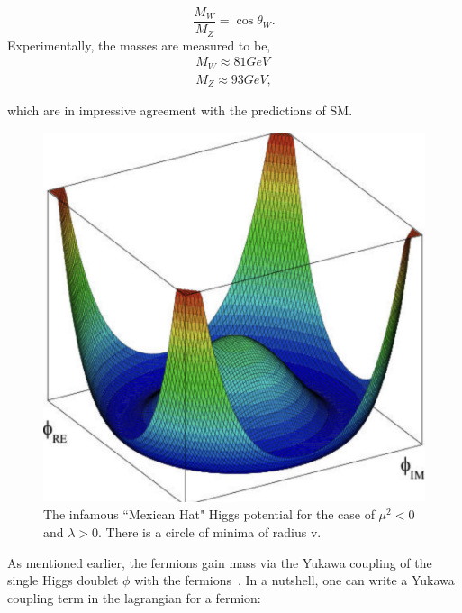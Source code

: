 \begin{equation}
    \frac{M_{W}}{M_{Z}} = \cos\theta_{W}.    
\end{equation}
Experimentally, the masses are measured to be,
\begin{equation}
\begin{align}
    M_W \approx 81 GeV \\
    M_Z \approx 93 GeV,
\end{align}
\end{equation}

which are in impressive agreement with the predictions of SM.


\begin{figure}[!htbp]
	\centering
    \includegraphics[scale=0.5]{fig/MexicanHat.png}
	\caption{The infamous ``Mexican Hat" Higgs potential for the case of $\mu^2 <0$ and $\lambda >0$. There is a circle of minima of radius v.}
	\label{fig:MexicanHat}
\end{figure}

As mentioned earlier, the fermions gain mass via the Yukawa coupling of the single Higgs doublet $\phi$ with the fermions~\cite{Nguyen:HiggsMechanism}. In a nutshell, one can write a Yukawa coupling term in the lagrangian for a fermion:

